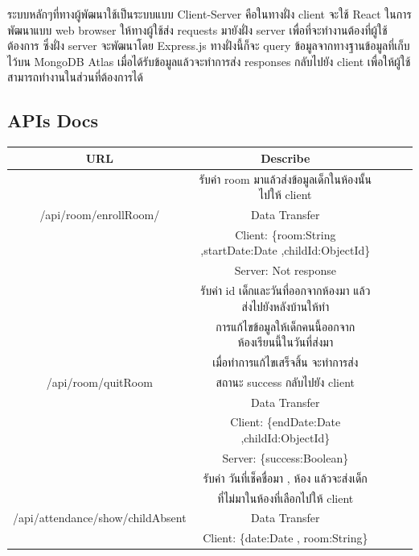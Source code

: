 ระบบหลักๆที่ทางผู้พัฒนาใช้เป็นระบบแบบ Client-Server คือในทางฝั่ง client จะใช้ React ในการพัฒนาแบบ web browser ให้ทางผู้ใช้ส่ง requests มายังฝั่ง server เพื่อที่จะทำงานต้องที่ผู้ใช้ต้องการ ซึ่งฝั่ง server 
จะพัฒนาโดย Express.js ทางฝั่งนี้ก็จะ query ข้อมูลจากทางฐานข้อมูลที่เก็บไว้บน MongoDB Atlas เมื่อได้รับข้อมูลแล้วจะทำการส่ง responses กลับไปยัง client เพื่อให้ผู้ใช้สามารถทำงานในส่วนที่ต้องการได้
\subsection{APIs Docs}
\begin{flushleft}
  \begin{tabular}{|c|c|c|c|c|}
  \hline
  URL & Describe \\
  \hline
  
   & รับค่า room มาแล้วส่งข้อมูลเด็กในห้องนั้นไปให้ client
  \\
  
  {/api/room/enrollRoom/}& Data Transfer
  
  \\ &Client: \{room:String ,startDate:Date ,childId:ObjectId\}
  \\ &Server: Not response
  \\ 
  \hline

  \hline
  
   & รับค่า id เด็กและวันที่ออกจากห้องมา แล้วส่งไปยังหลังบ้านให้ทำ
   
  \\ & การแก้ไขข้อมูลให้เด็กคนนี้ออกจากห้องเรียนนี้ในวันที่ส่งมา 
  \\ & เมื่อทำการแก้ไขเสร็จสิ้น จะทำการส่ง
  \\ {/api/room/quitRoom}&    สถานะ success กลับไปยัง client\\
  & Data Transfer
  
  \\ &Client: \{endDate:Date ,childId:ObjectId\}
  \\ &Server: \{success:Boolean\}
  \\ 
  \hline

  \hline
  
   & รับค่า วันที่เช็คชื่อมา , ห้อง แล้วจะส่งเด็ก
   
  \\
  & ที่ไม่มาในห้องที่เลือกไปให้ client
  \\
  
  {/api/attendance/show/childAbsent}& Data Transfer
  
  \\ &   Client: \{date:Date , room:String\}


\end{tabular}
\end{flushleft}
